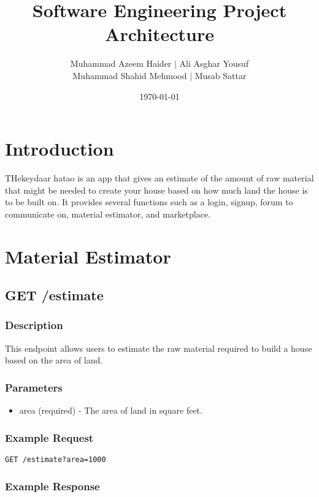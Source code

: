 \documentclass{article}
\title{Software Engineering Project Architecture}
\author{Muhammad Azeem Haider $\mid$ Ali Asghar Yousuf \\
      Muhammad Shahid Mehmood $\mid$ Musab Sattar}
\date{\today}
\begin{document}
\maketitle

\section{Introduction}

THekeydaar hatao is an app that gives an estimate of the amount of raw material that might be needed to create your house based on how much land the house is to be built on. It provides several functions such as a login, signup, forum to communicate on, material estimator, and marketplace.

\section{Material Estimator}

\subsection{GET /estimate}

\subsubsection{Description}

This endpoint allows users to estimate the raw material required to build a house based on the area of land.

\subsubsection{Parameters}

\begin{itemize}
  \item area (required) - The area of land in square feet.
\end{itemize}

\subsubsection{Example Request}

\begin{verbatim}
GET /estimate?area=1000
\end{verbatim}

\subsubsection{Example Response}
\end{document}
